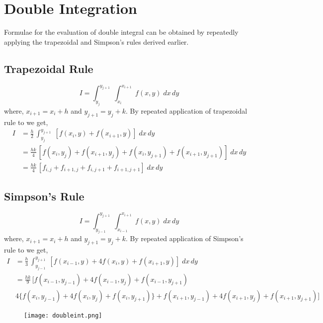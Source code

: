 \documentclass[aima203_lecturenotes_ku.tex]{subfiles}
\begin{document}
\section{Double Integration}
Formulae for the evaluation of double integral can be obtained by repeatedly applying the trapezoidal and Simpson's rules derived earlier.
\subsection{Trapezoidal Rule}
\begin{equation*}
  I = \int_{y_j}^{y_{j+1}}\; \int_{x_i}^{x_{i+1}} \; f(x,y)\;dx\,dy
\end{equation*}
where, $x_{i+1} = x_i + h$ and $y_{j+1} = y_j + k$.
By repeated application of trapezoidal rule to we get,
\begin{equation}
  \label{trapdouble}
  \begin{aligned}
    I &= \frac{h}{2} \,\int_{y_j}^{y_{j+1}}\; [f(x_i,y) + f(x_{i+1},y) ]\;dx\,dy \\[1mm]
      &= \frac{hk}{4} \, [f(x_i,y_j) + f(x_{i+1},y_j) + f(x_i,y_{j+1}) + f(x_{i+1},y_{j+1}) ]\;dx\,dy \\[1mm]
      &= \frac{hk}{4} \, [f_{i,j} + f_{i+1, j} + f_{i,j+1} + f_{i+1,j+1} ]\;dx\,dy
  \end{aligned}
\end{equation}

\subsection{Simpson's Rule}
\begin{equation*}
  I = \int_{y_{j-1}}^{y_{j+1}}\; \int_{x_{i-1}}^{x_{i+1}} \; f(x,y)\;dx\,dy
\end{equation*}
where, $x_{i+1} = x_i + h$ and $y_{j+1} = y_j + k$.
By repeated application of Simpson's rule to we get,
\begin{equation}
  \label{simpdouble}
  \begin{aligned}
    I &= \frac{h}{3} \,\int_{y_{j-1}}^{y_{j+1}}\; [f(x_{i-1},y) + 4f(x_i,y) + f(x_{i+1},y) ]\;dx\,dy \\[1mm]
      &= \frac{hk}{9} \, [f(x_{i-1},y_{j-1}) + 4f(x_{i-1},y_j) + f(x_{i-1},y_{j+1}) \\[1mm]
    & 4\{f(x_i,y_{j-1}) + 4f(x_i,y_j) + f(x_i,y_{j+1})\} + f(x_{i+1},y_{j-1}) + 4f(x_{i+1},y_j) + f(x_{i+1},y_{j+1})]
  \end{aligned}
\end{equation}
\begin{figure}[h]
  \centering
\texttt{[image: doubleint.png]}
\end{figure}
\end{document}
